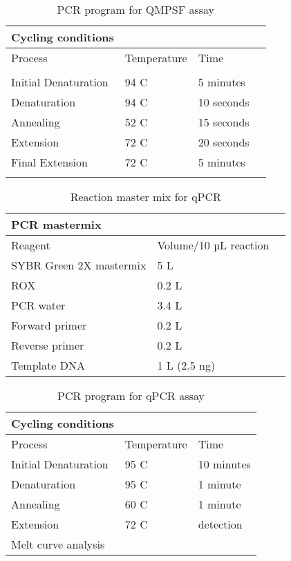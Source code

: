 \begin{table}
\caption{PCR program for QMPSF assay}
\label{tab:chap2table2.8}


\begin{tabular}{ | l | l | l | l | }
\hline
	Cycling conditions &  &  &  \\ \hline
	Process & Temperature & Time &  \\ \hline
	 &  &  &  \\ \hline
	Initial Denaturation & 94 \textdegree C & 5 minutes &  \\ \hline
	Denaturation & 94 \textdegree C & 10 seconds &  \\ \hline
	Annealing & 52 \textdegree C & 15 seconds         &  \\ \hline
	Extension & 72 \textdegree C & 20 seconds &  \\ \hline
	Final Extension & 72 \textdegree C & 5 minutes &  \\ \hline
	 &  &  &  \\ \hline
\end{tabular}
\end{table}

\begin{table}
\caption{Reaction master mix for qPCR}
\label{tab:chap2table2.10}

\begin{tabular}{ | l | l | l | }
\hline
	PCR mastermix &  &  \\ \hline
	Reagent & Volume/10 µL reaction &  \\ \hline
	SYBR Green 2X mastermix & 5 \si{\micro}L &  \\ \hline
	ROX & 0.2 \si{\micro}L &  \\ \hline
	PCR water & 3.4 \si{\micro}L &  \\ \hline
	Forward primer & 0.2 \si{\micro}L  &  \\ \hline
	Reverse primer & 0.2 \si{\micro}L  &  \\ \hline
	Template DNA & 1 \si{\micro}L (2.5 ng) &  \\ \hline
\end{tabular}
\end{table}

\begin{table}

\caption{PCR program for qPCR assay}
\label{tab:chap2table2.11}


\begin{tabular}{ | l | l | l | }
\hline
	Cycling conditions &  &  \\ \hline
	Process & Temperature & Time \\ \hline
	Initial Denaturation & 95 \textdegree C & 10 minutes \\ \hline
	Denaturation & 95 \textdegree C & 1 minute \\ \hline
	Annealing & 60 \textdegree C & 1 minute         \\ \hline
	Extension & 72 \textdegree C & detection \\ \hline
	Melt curve analysis &  &  \\ \hline
\end{tabular}
\end{table}